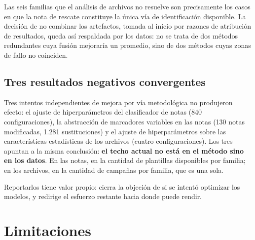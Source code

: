 \documentclass[11pt,a4paper]{article}
\begin{document}
Las seis familias que el análisis de archivos no resuelve son precisamente los casos en que la
nota de rescate constituye la única vía de identificación disponible. La decisión de no
combinar los artefactos, tomada al inicio por razones de atribución de resultados, queda así
respaldada por los datos: no se trata de dos métodos redundantes cuya fusión mejoraría un
promedio, sino de dos métodos cuyas zonas de fallo no coinciden.

\subsection{Tres resultados negativos convergentes}

Tres intentos independientes de mejora por vía metodológica no produjeron efecto: el ajuste de
hiperparámetros del clasificador de notas (840 configuraciones), la abstracción de marcadores
variables en las notas (130 notas modificadas, 1.281 sustituciones) y el ajuste de
hiperparámetros sobre las características estadísticas de los archivos (cuatro
configuraciones). Los tres apuntan a la misma conclusión: \textbf{el techo actual no está en el
método sino en los datos}. En las notas, en la cantidad de plantillas disponibles por familia;
en los archivos, en la cantidad de campañas por familia, que es una sola.

Reportarlos tiene valor propio: cierra la objeción de si se intentó optimizar los modelos, y
redirige el esfuerzo restante hacia donde puede rendir.

\section{Limitaciones}
\end{document}
